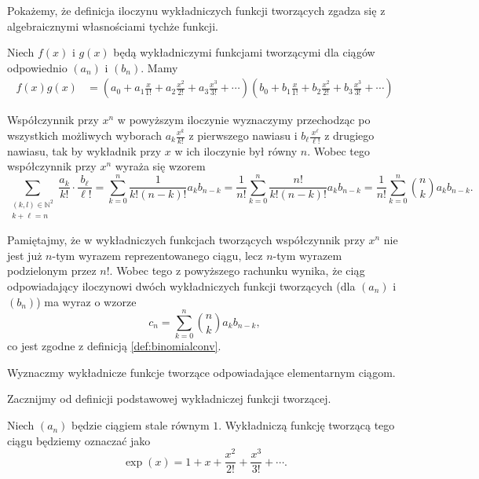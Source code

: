 \documentclass[shortabstract]{imthesis}
\begin{document}
Pokażemy, że definicja iloczynu wykładniczych funkcji tworzących zgadza się z algebraicznymi własnościami tychże funkcji. 

Niech $f(x)$ i $g(x)$ będą wykładniczymi funkcjami tworzącymi dla ciągów odpowiednio $(a_n)$ i $(b_n)$. Mamy
\begin{align*}
    f(x)g(x) &= \left(a_0 + a_1\frac{x}{1!} + a_2\frac{x^2}{2!} + a_3\frac{x^3}{3!} + \cdots\right)\left(b_0 + b_1\frac{x}{1!} + b_2\frac{x^2}{2!} + b_3\frac{x^3}{3!} + \cdots\right)
\end{align*}

Współczynnik przy $x^n$ w powyższym iloczynie wyznaczymy przechodząc po wszystkich możliwych wyborach $a_k\frac{x^k}{k!}$ z pierwszego nawiasu i $b_\ell \frac{x^\ell}{\ell!}$ z drugiego nawiasu, tak by wykładnik przy $x$ w ich iloczynie był równy $n$. Wobec tego współczynnik przy $x^n$ wyraża się wzorem
$$
\sum_{\substack{(k, l) \in \mathbb{N}^2 \\ k + \ell = n}} \frac{a_k}{k!} \cdot \frac{b_\ell}{\ell!} = \sum_{k=0}^n \frac{1}{k!(n-k)!} a_k b_{n-k} = \frac{1}{n!} \sum_{k=0}^n \frac{n!}{k!(n-k)!} a_k b_{n-k} = \frac{1}{n!} \sum_{k=0}^n {n \choose k} a_k b_{n-k}.
$$

Pamiętajmy, że w wykładniczych funkcjach tworzących współczynnik przy $x^n$ nie jest już $n$-tym wyrazem reprezentowanego ciągu, lecz $n$-tym wyrazem podzielonym przez $n!$. Wobec tego z powyższego rachunku wynika, że ciąg odpowiadający iloczynowi dwóch wykładniczych funkcji tworzących (dla $(a_n)$ i $(b_n)$) ma wyraz o wzorze
$$
c_n = \sum_{k=0}^n {n \choose k} a_k b_{n-k},
$$
co jest zgodne z definicją \ref{def:binomialconv}.

Wyznaczmy wykładnicze funkcje tworzące odpowiadające elementarnym ciągom. 

Zacznijmy od definicji podstawowej wykładniczej funkcji tworzącej.

\begin{definition} \label{def:exp}
    Niech $(a_n)$ będzie ciągiem stale równym $1$. Wykładniczą funkcję tworzącą tego ciągu będziemy oznaczać jako
    $$
    \exp(x) = 1 + x + \frac{x^2}{2!} + \frac{x^3}{3!} + \cdots.
    $$
\end{definition}
\end{document}
